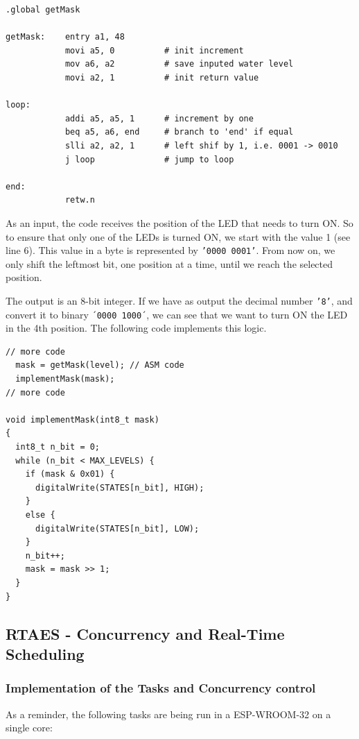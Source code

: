 \documentclass[11pt]{article}
\begin{document}
\begin{verbatim}
.global getMask

getMask:    entry a1, 48
            movi a5, 0          # init increment
            mov a6, a2          # save inputed water level
            movi a2, 1          # init return value

loop: 
            addi a5, a5, 1      # increment by one
            beq a5, a6, end     # branch to 'end' if equal
            slli a2, a2, 1      # left shif by 1, i.e. 0001 -> 0010
            j loop              # jump to loop 

end:
            retw.n
\end{verbatim}

As an input, the code receives the position of the LED that needs to turn ON. So to ensure that only one of the LEDs is turned ON, we start with the value 1 (see line 6). This value in a byte is represented by \texttt{'0000 0001'}. From now on, we only shift the leftmost bit, one position at a time, until we reach the selected position.

The output is an 8-bit integer. If we have as output the decimal number \texttt{'8'}, and convert it to binary \texttt{´0000 1000´}, we can see that we want to turn ON the LED in the 4th position. The following code implements this logic. 

\begin{verbatim}
// more code
  mask = getMask(level); // ASM code
  implementMask(mask);
// more code

void implementMask(int8_t mask)
{
  int8_t n_bit = 0;
  while (n_bit < MAX_LEVELS) {
    if (mask & 0x01) {
      digitalWrite(STATES[n_bit], HIGH);
    }
    else {
      digitalWrite(STATES[n_bit], LOW);
    }
    n_bit++;
    mask = mask >> 1;
  }
}
\end{verbatim}


\subsection{RTAES - Concurrency and Real-Time Scheduling}

\subsubsection{Implementation of the Tasks and Concurrency control}

As a reminder, the following tasks are being run in a ESP-WROOM-32 on a single core:
\end{document}
